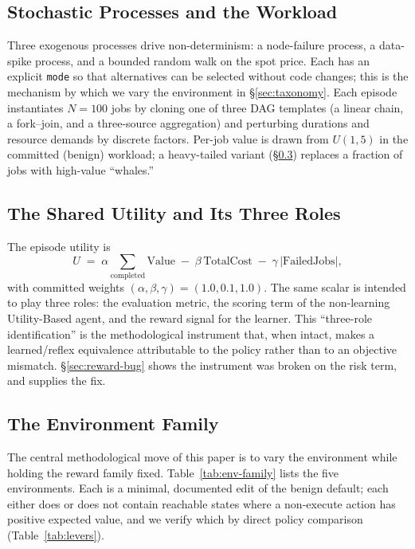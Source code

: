 \documentclass[10pt,twocolumn]{article}
\begin{document}
\subsection{Stochastic Processes and the Workload}
\label{sec:stochastic}
Three exogenous processes drive non-determinism: a node-failure process, a
data-spike process, and a bounded random walk on the spot price. Each has an
explicit \texttt{mode} so that alternatives can be selected without code changes;
this is the mechanism by which we vary the environment in
\S\ref{sec:taxonomy}. Each episode instantiates $N=100$ jobs by cloning one of
three DAG templates (a linear chain, a fork--join, and a three-source
aggregation) and perturbing durations and resource demands by discrete factors.
Per-job value is drawn from $U(1,5)$ in the committed (benign) workload; a
heavy-tailed variant (\S\ref{sec:env-family}) replaces a fraction of jobs with
high-value ``whales.''

\subsection{The Shared Utility and Its Three Roles}
\label{sec:utility}
The episode utility is
\begin{equation}
\label{eq:episode-utility}
U \;=\; \alpha\!\sum_{\text{completed}}\!\mathrm{Value}
   \;-\; \beta\,\mathrm{TotalCost}
   \;-\; \gamma\,|\text{FailedJobs}|,
\end{equation}
with committed weights $(\alpha,\beta,\gamma)=(1.0,0.1,1.0)$. The same scalar is
intended to play three roles: the evaluation metric, the scoring term of the
non-learning Utility-Based agent, and the reward signal for the learner. This
``three-role identification'' is the methodological instrument that, when intact,
makes a learned/reflex equivalence attributable to the policy rather than to an
objective mismatch. \S\ref{sec:reward-bug} shows the instrument was broken on the
risk term, and supplies the fix.

\subsection{The Environment Family}
\label{sec:env-family}
The central methodological move of this paper is to vary the environment while
holding the reward family fixed. Table~\ref{tab:env-family} lists the five
environments. Each is a minimal, documented edit of the benign default; each
either does or does not contain reachable states where a non-execute action has
positive expected value, and we verify which by direct policy comparison
(Table~\ref{tab:levers}).
\end{document}
